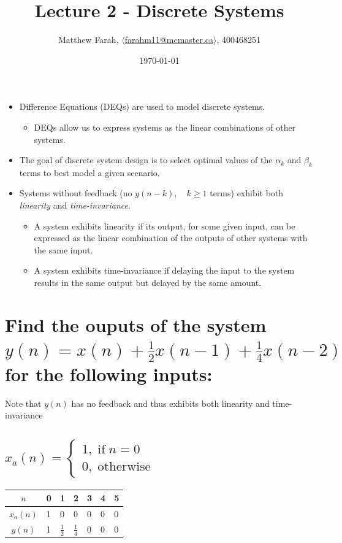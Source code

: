 \documentclass{article}
\title{Lecture 2 - Discrete Systems}
\author{Matthew Farah, \href{mailto:farahm11@mcmaster.ca}{$\langle$farahm11@mcmaster.ca$\rangle$}, 400468251}
\date{\today}
\renewcommand{\thesubsection}{\thesection.\alph{subsection}}
\begin{document}
\maketitle
\pagestyle{fancy}

\begin{itemize}
	\item Difference Equations (DEQs) are used to model discrete systems.
	\begin{itemize}
		\item DEQs allow us to express systems as the linear combinations of other systems.
	\end{itemize}
	\item The goal of discrete system design is to select optimal values of the $\alpha_k$ and $\beta_k$ terms to best model a given scenario.
	\item Systems without feedback (no $y(n-k), \quad k \ge 1$ terms) exhibit both \emph{linearity} and \emph{time-invariance}.
	\begin{itemize}
		\item A system exhibits linearity if its output, for some given input, can be expressed as the linear combination of the outputs of other systems with the same input.
		\item A system exhibits time-invariance if delaying the input to the system results in the same output but delayed by the same amount.
	\end{itemize}
\end{itemize}

\section[Example ~\thesection]{Find the ouputs of the system $y(n) = x(n) + \frac{1}{2}x(n-1) + \frac{1}{4}x(n-2)$ for the following inputs:}
Note that $y(n)$ has no feedback and thus exhibits both linearity and time-invariance

\subsection[~\thesubsection]{$x_a(n) = \begin{cases} 1, \; \text{if} \; n = 0 \\ 0, \; \text{otherwise} \end{cases}$}

\begin{tabularx}{\linewidth}{| c || Y Y Y Y Y Y |}
	\hline
	$n$ & 0 & 1 & 2 & 3 & 4 & 5 \\
	\hline
	$x_a(n)$ & 1 & 0 & 0 & 0 & 0 & 0 \\
	$y(n)$ & 1 & $\tfrac{1}{2}$ & $\tfrac{1}{4}$ & 0 & 0 & 0 \\
	\hline
\end{tabularx}
\end{document}
